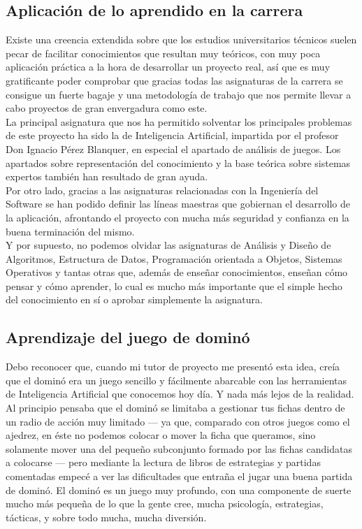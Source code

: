 \subsection{Aplicación de lo aprendido en la carrera}

Existe una creencia extendida sobre que los estudios universitarios técnicos suelen pecar de facilitar conocimientos que
resultan muy teóricos, con muy poca aplicación práctica a la hora de desarrollar un proyecto real, así que es muy
gratificante poder comprobar que gracias todas las asignaturas de la carrera se consigue un fuerte bagaje y una metodología
de trabajo que nos permite llevar a cabo proyectos de gran envergadura como este. \\

La principal asignatura que nos ha permitido solventar los principales problemas de este proyecto ha sido la de Inteligencia
Artificial, impartida por el profesor Don Ignacio Pérez Blanquer, en especial el apartado de análisis de juegos. Los apartados
sobre representación del conocimiento y la base teórica sobre sistemas expertos también han resultado de gran ayuda. \\

Por otro lado, gracias a las asignaturas relacionadas con la Ingeniería del Software se han podido definir las líneas
maestras que gobiernan el desarrollo de la aplicación, afrontando el proyecto con mucha más seguridad y confianza en la
buena terminación del mismo. \\

Y por supuesto, no podemos olvidar las asignaturas de Análisis y Diseño de Algoritmos, Estructura de Datos, Programación
orientada a Objetos, Sistemas Operativos y tantas otras que, además de enseñar conocimientos, enseñan cómo pensar y
cómo aprender, lo cual es mucho más importante que el simple hecho del conocimiento en sí o aprobar simplemente la asignatura.


\subsection{Aprendizaje del juego de dominó}

Debo reconocer que, cuando mi tutor de proyecto me presentó esta idea, creía que el dominó era un juego sencillo y
fácilmente abarcable con las herramientas de Inteligencia Artificial que conocemos hoy día. Y nada más lejos de la realidad. \\

Al principio pensaba que el dominó se limitaba a gestionar tus fichas dentro de un radio de acción muy limitado --- ya
que, comparado con otros juegos como el ajedrez, en éste no podemos colocar o mover la ficha que queramos, sino 
solamente mover una del pequeño subconjunto formado por las fichas candidatas a colocarse --- pero mediante la lectura
de libros de estrategias y partidas comentadas empecé a ver las dificultades que entraña el jugar una buena partida
de dominó. El dominó es un juego muy profundo, con una componente de suerte mucho más pequeña de lo que la gente cree,
mucha psicología, estrategias, tácticas, y sobre todo mucha, mucha diversión. \\

